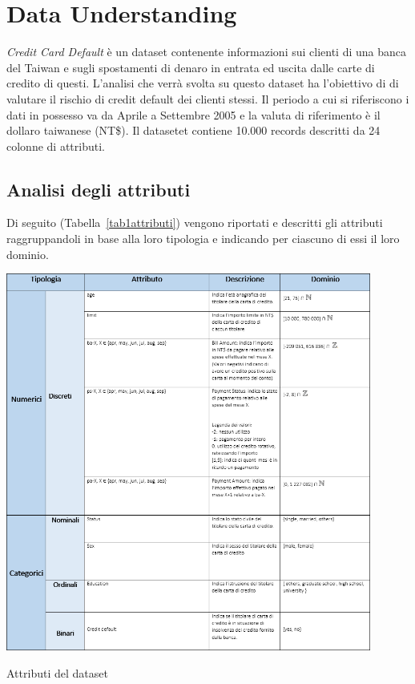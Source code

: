 \chapter{Data Understanding}

\textit{Credit Card Default} \`e un dataset contenente informazioni sui clienti di una banca 
del Taiwan e sugli spostamenti di denaro in entrata ed uscita dalle carte di credito di questi.
L'analisi che verrà svolta su questo dataset ha l'obiettivo di di valutare il rischio di credit default
 dei clienti stessi.
Il periodo a cui si riferiscono i dati in possesso va da Aprile
a Settembre 2005 e la valuta di riferimento \`e il dollaro
taiwanese (NT\$). Il datasetet contiene 10.000 records descritti
da 24 colonne di attributi.

\section{Analisi degli attributi}

Di seguito (Tabella~\ref{tab1attributi}) vengono riportati
e descritti gli attributi raggruppandoli in base alla loro
tipologia e indicando per ciascuno di essi il loro dominio.

\begin{table}[H]
	\centering
	\includegraphics[width=12cm]{img/tabella1-attributi.png}
	\caption[LOF entry]{Attributi del dataset}
	\label{tab1attributi}
\end{table} 

